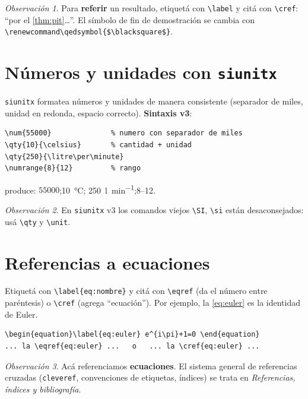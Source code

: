 \documentclass[11pt,a4paper]{article}
\newcommand{\C}[1]{\texttt{\textbackslash #1}}   %
\theoremstyle{plain}      %
\theoremstyle{definition} %
\theoremstyle{remark}
\newtheorem*{obs}{Observación}
\begin{document}
\begin{obs}
Para \textbf{referir} un resultado, etiquetá con \C{label} y citá con \C{cref}:
\enquote{por el \cref{thm:pit}\dots}. El símbolo de fin de demostración se
cambia con \verb|\renewcommand\qedsymbol{$\blacksquare$}|.
\end{obs}

\section{Números y unidades con \texttt{siunitx}}
\texttt{siunitx} formatea números y unidades de manera consistente (separador
de miles, unidad en redonda, espacio correcto). \textbf{Sintaxis v3}:
\begin{lstlisting}
\num{55000}              % numero con separador de miles
\qty{10}{\celsius}       % cantidad + unidad
\qty{250}{\litre\per\minute}
\numrange{8}{12}         % rango
\end{lstlisting}
produce: $\num{55000}$;\quad \qty{10}{\celsius};\quad
\qty{250}{\litre\per\minute};\quad \numrange{8}{12}.

\begin{obs}
En \texttt{siunitx} v3 los comandos viejos \C{SI}, \C{si} están desaconsejados:
usá \C{qty} y \C{unit}.
\end{obs}

\section{Referencias a ecuaciones}
Etiquetá con \C{label\{eq:nombre\}} y citá con \C{eqref} (da el número entre
paréntesis) o \C{cref} (agrega \enquote{ecuación}). Por ejemplo, la
\cref{eq:euler} es la identidad de Euler.
\begin{lstlisting}
\begin{equation}\label{eq:euler} e^{i\pi}+1=0 \end{equation}
... la \eqref{eq:euler} ...   o   ... la \cref{eq:euler} ...
\end{lstlisting}
\begin{obs}
Acá referenciamos \textbf{ecuaciones}. El sistema general de referencias
cruzadas (\texttt{cleveref}, convenciones de etiquetas, índices) se trata en
\emph{Referencias, índices y bibliografía}.
\end{obs}
\end{document}
